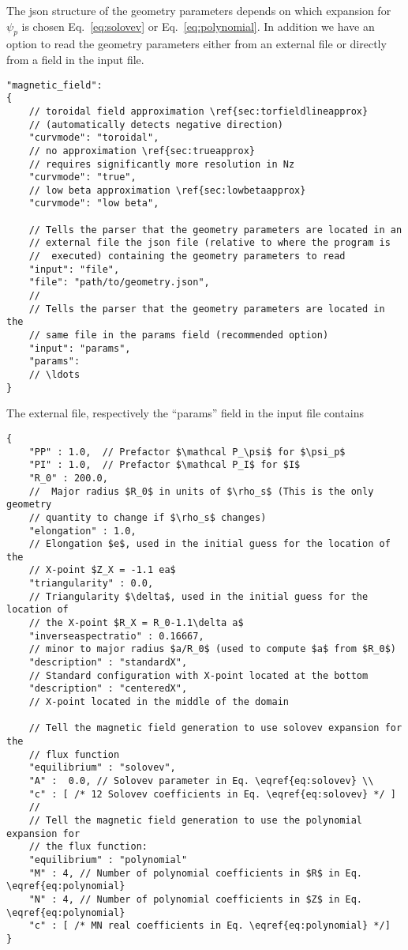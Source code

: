The json structure of the geometry parameters depends on which expansion for $\psi_p$ is chosen Eq.~\eqref{eq:solovev} or Eq.~\eqref{eq:polynomial}.
In addition we have an option to read the geometry parameters either from an external
file or directly from a field in the input file.
\begin{verbatim}
"magnetic_field":
{
    // toroidal field approximation \ref{sec:torfieldlineapprox}
    // (automatically detects negative direction)
    "curvmode": "toroidal",
    // no approximation \ref{sec:trueapprox}
    // requires significantly more resolution in Nz
    "curvmode": "true",
    // low beta approximation \ref{sec:lowbetaapprox}
    "curvmode": "low beta",

    // Tells the parser that the geometry parameters are located in an
    // external file the json file (relative to where the program is
    //  executed) containing the geometry parameters to read
    "input": "file",
    "file": "path/to/geometry.json",
    //
    // Tells the parser that the geometry parameters are located in the
    // same file in the params field (recommended option)
    "input": "params",
    "params":
    // \ldots
}
\end{verbatim}
\noindent
The external file, respectively the ``params'' field in the input file
contains
\begin{verbatim}
{
    "PP" : 1.0,  // Prefactor $\mathcal P_\psi$ for $\psi_p$
    "PI" : 1.0,  // Prefactor $\mathcal P_I$ for $I$
    "R_0" : 200.0,
    //  Major radius $R_0$ in units of $\rho_s$ (This is the only geometry
    // quantity to change if $\rho_s$ changes)
    "elongation" : 1.0,
    // Elongation $e$, used in the initial guess for the location of the
    // X-point $Z_X = -1.1 ea$
    "triangularity" : 0.0,
    // Triangularity $\delta$, used in the initial guess for the location of
    // the X-point $R_X = R_0-1.1\delta a$
    "inverseaspectratio" : 0.16667,
    // minor to major radius $a/R_0$ (used to compute $a$ from $R_0$)
    "description" : "standardX",
    // Standard configuration with X-point located at the bottom
    "description" : "centeredX",
    // X-point located in the middle of the domain

    // Tell the magnetic field generation to use solovev expansion for the
    // flux function
    "equilibrium" : "solovev",
    "A" :  0.0, // Solovev parameter in Eq. \eqref{eq:solovev} \\
    "c" : [ /* 12 Solovev coefficients in Eq. \eqref{eq:solovev} */ ]
    //
    // Tell the magnetic field generation to use the polynomial expansion for
    // the flux function:
    "equilibrium" : "polynomial"
    "M" : 4, // Number of polynomial coefficients in $R$ in Eq. \eqref{eq:polynomial}
    "N" : 4, // Number of polynomial coefficients in $Z$ in Eq. \eqref{eq:polynomial}
    "c" : [ /* MN real coefficients in Eq. \eqref{eq:polynomial} */]
}
\end{verbatim}
